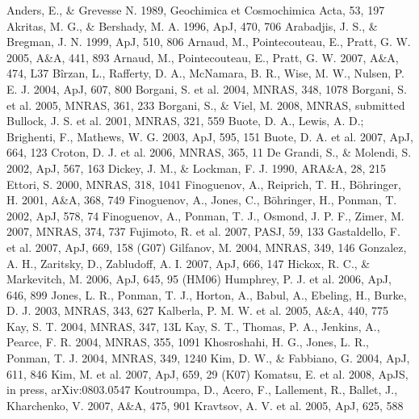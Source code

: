 \documentclass{aastex}
\begin{document}
\begin{references}

  Anders, E., \& Grevesse N. 1989, Geochimica et Cosmochimica Acta, 53, 197
  Akritas, M. G., \& Bershady, M. A. 1996, ApJ, 470, 706
  Arabadjis, J. S., \& Bregman, J. N. 1999, ApJ, 510, 806
  Arnaud, M., Pointecouteau, E., Pratt, G. W. 2005, A\&A, 441, 893
  Arnaud, M., Pointecouteau, E., Pratt, G. W. 2007, A\&A, 474, L37
  B\^{i}rzan, L., Rafferty, D. A., McNamara, B. R., Wise, M. W., Nulsen, P. E. J. 2004, ApJ, 607, 800
  Borgani, S. et al. 2004, MNRAS, 348, 1078
  Borgani, S. et al. 2005, MNRAS, 361, 233
  Borgani, S., \& Viel, M. 2008, MNRAS, submitted
  Bullock, J. S. et al. 2001, MNRAS, 321, 559
  Buote, D. A., Lewis, A. D.; Brighenti, F., Mathews, W. G. 2003, ApJ, 595, 151
  Buote, D. A. et al. 2007, ApJ, 664, 123
  Croton, D. J. et al. 2006, MNRAS, 365, 11 
  De Grandi, S., \& Molendi, S. 2002, ApJ, 567, 163
  Dickey, J. M., \& Lockman, F. J. 1990, ARA\&A, 28, 215
  Ettori, S. 2000, MNRAS, 318, 1041	
  Finoguenov, A., Reiprich, T. H., B\"{o}hringer, H. 2001, A\&A, 368, 749
  Finoguenov, A., Jones, C., B\"{o}hringer, H., Ponman, T. 2002, ApJ, 578, 74
  Finoguenov, A., Ponman, T. J., Osmond, J. P. F., Zimer, M. 2007, MNRAS, 374, 737
  Fujimoto, R. et al. 2007, PASJ, 59, 133
  Gastaldello, F. et al. 2007, ApJ, 669, 158 (G07)
  Gilfanov, M. 2004, MNRAS, 349, 146
  Gonzalez, A. H., Zaritsky, D., Zabludoff, A. I. 2007, ApJ, 666, 147
  Hickox, R. C., \& Markevitch, M. 2006, ApJ, 645, 95 (HM06)
  Humphrey, P. J. et al. 2006, ApJ, 646, 899
  Jones, L. R., Ponman, T. J., Horton, A., Babul, A., Ebeling, H., Burke, D. J. 2003, MNRAS, 343, 627
  Kalberla, P. M. W. et al. 2005, A\&A, 440, 775
  Kay, S. T. 2004, MNRAS, 347, 13L
  Kay, S. T., Thomas, P. A., Jenkins, A., Pearce, F. R. 2004, MNRAS, 355, 1091
  Khosroshahi, H. G., Jones, L. R., Ponman, T. J. 2004, MNRAS, 349, 1240
  Kim, D. W., \& Fabbiano, G. 2004, ApJ, 611, 846
  Kim, M. et al. 2007, ApJ, 659, 29 (K07)
  Komatsu, E. et al. 2008, ApJS, in press, arXiv:0803.0547
  Koutroumpa, D., Acero, F., Lallement, R., Ballet, J., Kharchenko, V. 2007, A\&A, 475, 901
  Kravtsov, A. V. et al. 2005, ApJ, 625, 588

\end{references}
\end{document}
